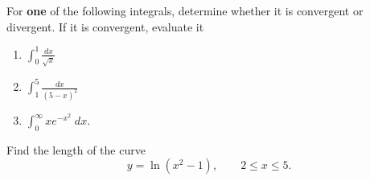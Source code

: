 \begin{problem}
For \textbf{one} of the following integrals, determine whether it is
convergent or divergent. If it is convergent, evaluate it
\begin{enumerate}[label=(\alph*),noitemsep]
\item $\displaystyle\int_0^1\frac{dx}{\sqrt{x}}$
\item $\displaystyle\int_1^5\frac{dx}{(5-x)^2}$
\item $\displaystyle\int_0^\infty xe^{-x^2}\;dx$.
\end{enumerate}
\end{problem}
\bigskip
\begin{problem}
Find the length of the curve
\[
y=\ln\left(x^2-1\right),\qquad 2\leq x\leq 5.
\]
\end{problem}

